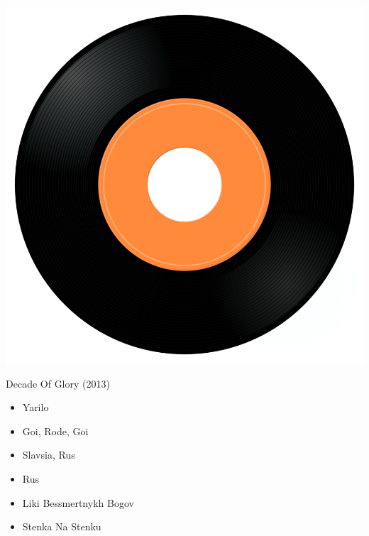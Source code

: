 \begin{minipage}[t]{0.25\textwidth}
\captionsetup{type=figure}
\includegraphics[width=\textwidth]{Images/cover.png}
\caption*{Decade Of Glory (2013)}
\end{minipage}
\begin{minipage}[t]{0.25\textwidth}\vspace{0pt}
\begin{itemize}[nosep,leftmargin=1em,labelwidth=*,align=left]
	\setlength{\itemsep}{0pt}
	\item Yarilo
	\item Goi, Rode, Goi
	\item Slavsia, Rus
	\item Rus
	\item Liki Bessmertnykh Bogov
	\item Stenka Na Stenku
\end{itemize}
\end{minipage}
